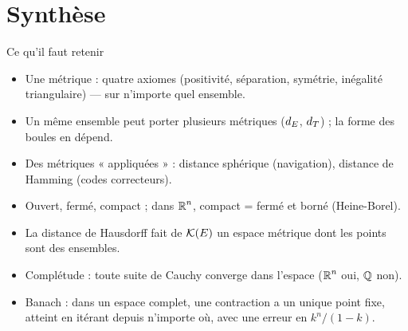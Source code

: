 \section{Synthèse}

\begin{frame}{Ce qu'il faut retenir}
  \small
  \begin{itemize}
    \item Une métrique : quatre axiomes (positivité,
      séparation, symétrie, inégalité triangulaire) --- sur
      n'importe quel ensemble.
    \item Un même ensemble peut porter plusieurs métriques ($d_E$,
      $d_T$) ; la forme des boules en dépend.
    \item Des métriques « appliquées » : distance sphérique
      (navigation), distance de Hamming (codes correcteurs).
    \item Ouvert, fermé, compact ; dans $\operatorname{\mathbb{R}}^n$,
      compact = fermé et borné (Heine-Borel).
    \item La distance de Hausdorff fait de $\mathcal{K}(E)$ un espace
      métrique dont les points sont des ensembles.
    \item Complétude : toute suite de Cauchy converge dans
      l'espace ($\operatorname{\mathbb{R}}^n$ oui, $\operatorname{\mathbb{Q}}$ non).
    \item Banach : dans un espace complet, une contraction a un
      unique point fixe, atteint en itérant depuis n'importe où, avec
      une erreur en $k^n/(1-k)$.
  \end{itemize}
\end{frame}

